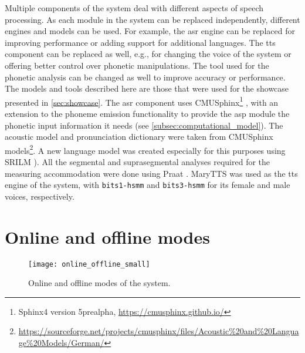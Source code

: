 Multiple components of the system deal with different aspects of speech processing.
As each module in the system can be replaced independently, different engines and models can be used.
For example, the \ac{asr} engine can be replaced for improving performance or adding support for additional languages.
The \ac{tts} component can be replaced as well, e.g., for changing the voice of the system or offering better control over phonetic manipulations.
The tool used for the phonetic analysis can be changed as well to improve accuracy or performance.
The models and tools described here are those that were used for the showcase presented in \cref{sec:showcase}.
The \ac{asr} component uses CMUSphinx\footnote{Sphinx4 version 5prealpha, \url{https://cmusphinx.github.io/}} \citep{Lamere2003sphinx}, with an extension to the phoneme emission functionality to provide the \ac{asp} module the phonetic input information it needs (see \cref{subsec:computational_model}).
The acoustic model and pronunciation dictionary were taken from CMUSphinx models\footnote{\url{https://sourceforge.net/projects/cmusphinx/files/Acoustic\%20and\%20Language\%20Models/German/}}.
A new language model was created especially for this purposes using SRILM \citep{Stolcke2002SRILM}).
All the segmental and suprasegmental analyses required for the measuring accommodation were done using Praat \citep{Boersma2018praat}.
MaryTTS \citep{LeMaguer2017uprooted, Schroeder2003mary} was used as the \ac{tts} engine of the system, with \texttt{bits1-hsmm} and \texttt{bits3-hsmm} for its female and male voices, respectively.

\section{Online and offline modes}
\label{sec:online_and_offline_modes}

\begin{figure}[t]
	\centering
	\texttt{[image: online\_offline\_small]}
	\caption[Online (orange) and offline (blue) modes of the responsive \acl{sds}]
		{Online and offline modes of the system.}
	\label{fig:online_offline_modes}
\end{figure}

